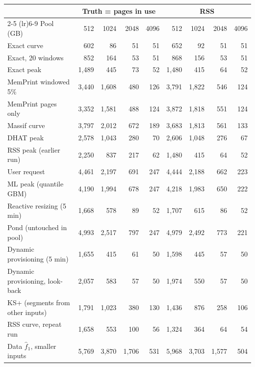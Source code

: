 \begin{tabular}{lrrrrrrrr}
\toprule
 & \multicolumn{4}{c}{Truth = pages in use} & \multicolumn{4}{c}{RSS} \\
\cmidrule(lr){2-5} \cmidrule(lr){6-9}
Pool (GB) & 512 & 1024 & 2048 & 4096 & 512 & 1024 & 2048 & 4096 \\
\midrule
Exact curve & 602 & 86 & 51 & 51 & 652 & 92 & 51 & 51 \\
Exact, 20 windows & 852 & 164 & 53 & 51 & 868 & 156 & 53 & 51 \\
Exact peak & 1{,}489 & 445 & 73 & 52 & 1{,}480 & 415 & 64 & 52 \\
MemPrint windowed 5\% & 3{,}440 & 1{,}608 & 480 & 126 & 3{,}791 & 1{,}822 & 546 & 124 \\
MemPrint pages only & 3{,}352 & 1{,}581 & 488 & 124 & 3{,}872 & 1{,}818 & 551 & 124 \\
Massif curve & 3{,}797 & 2{,}012 & 672 & 189 & 3{,}683 & 1{,}813 & 561 & 133 \\
DHAT peak & 2{,}578 & 1{,}043 & 280 & 70 & 2{,}606 & 1{,}048 & 276 & 67 \\
RSS peak (earlier run) & 2{,}250 & 837 & 217 & 62 & 1{,}480 & 415 & 64 & 52 \\
User request & 4{,}461 & 2{,}197 & 691 & 247 & 4{,}444 & 2{,}188 & 662 & 223 \\
ML peak (quantile GBM) & 4{,}190 & 1{,}994 & 678 & 247 & 4{,}218 & 1{,}983 & 650 & 222 \\
Reactive resizing (5 min) & 1{,}668 & 578 & 89 & 52 & 1{,}707 & 615 & 86 & 52 \\
Pond (untouched in pool) & 4{,}993 & 2{,}517 & 797 & 247 & 4{,}979 & 2{,}492 & 773 & 221 \\
Dynamic provisioning (5 min) & 1{,}655 & 415 & 61 & 50 & 1{,}598 & 445 & 57 & 50 \\
Dynamic provisioning, look-back & 2{,}057 & 583 & 57 & 50 & 1{,}974 & 550 & 57 & 50 \\
KS+ (segments from other inputs) & 1{,}791 & 1{,}023 & 380 & 130 & 1{,}436 & 876 & 258 & 106 \\
RSS curve, repeat run & 1{,}658 & 553 & 100 & 56 & 1{,}324 & 364 & 64 & 54 \\
Data $\hat f_1$, smaller inputs & 5{,}769 & 3{,}870 & 1{,}706 & 531 & 5{,}968 & 3{,}703 & 1{,}577 & 504 \\
\bottomrule
\end{tabular}
